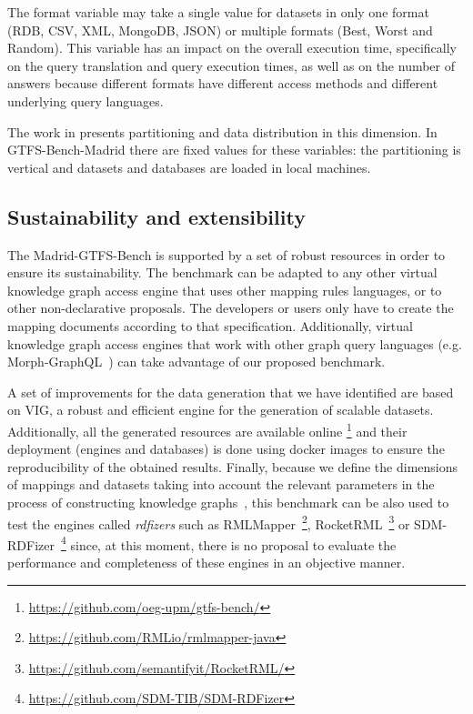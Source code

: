 The format variable may take a single value for datasets in only one format (RDB, CSV, XML, MongoDB, JSON) or multiple formats (Best, Worst and Random). This variable has an impact on the overall execution time, specifically on the query translation and query execution times, as well as on the number of answers because  different formats have different access methods and different underlying query languages.

The work in \citep{montoya2012benchmarking} presents partitioning and data distribution in this dimension. In GTFS-Bench-Madrid there are fixed values for these variables: the partitioning is vertical and datasets and databases are loaded in local machines.





\subsection{Sustainability and extensibility}
The Madrid-GTFS-Bench is supported by a set of robust resources in order to ensure its sustainability. The benchmark can be adapted to any other virtual knowledge graph access engine that uses other mapping rules languages, or to other non-declarative proposals. The developers or users only have to create the mapping documents according to that specification. Additionally, virtual knowledge graph access engines that work with other graph query languages (e.g. Morph-GraphQL~\citep{priyatna2019morph}) can take advantage of our proposed benchmark. 

A set of improvements for the data generation that we have identified are based on VIG, a robust and efficient engine for the generation of scalable datasets. Additionally, all the generated resources are available online \footnote{\url{https://github.com/oeg-upm/gtfs-bench/}} and their deployment (engines and databases) is done using docker images to ensure the reproducibility of the obtained results. Finally, because we define the dimensions of mappings and datasets taking into account the relevant parameters in the process of constructing knowledge graphs~\citep{chaves2019what}, this benchmark can be also used to test the engines called \textit{rdfizers} such as RMLMapper~\footnote{\url{https://github.com/RMLio/rmlmapper-java}}, RocketRML~\footnote{\url{https://github.com/semantifyit/RocketRML/}} or SDM-RDFizer~\footnote{\url{https://github.com/SDM-TIB/SDM-RDFizer}} since, at this moment, there is no proposal to evaluate the performance and completeness of these engines in an objective manner.

